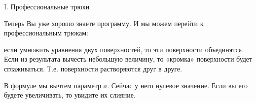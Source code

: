 \documentclass[ru]{./../../common/SurferDesc}%
\begin{document}
\footnotesize
%

\begin{surferPage}
  \begin{surferTitle}I. Профессиональные трюки\end{surferTitle}
   \begin{surferText}

Теперь Вы уже хорошо знаете программу. И мы можем перейти к профессиональным трюкам:

если умножить уравнения двух поверхностей, то эти поверхности объединятся. Если из результата вычесть небольшую величину, то «кромка» поверхности будет сглаживаться. Т.е. поверхности растворяются друг в друге.

В формуле мы вычтем параметр $a$. Сейчас у него нулевое значение. Если вы его будете увеличивать, то увидите их слияние.

   \end{surferText}
\end{surferPage}

 
\end{document}
